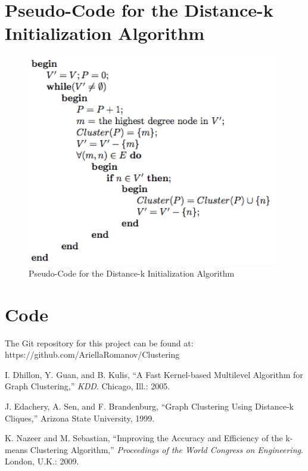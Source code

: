 \documentclass[12pt]{article}
\begin{document}
\newpage
\section{Pseudo-Code for the Distance-k Initialization Algorithm}
\label{appendix:distk_init}
\begin{figure}[!htb]
\begin{center}
	\includegraphics[height=25em]{distk_init}
	\caption{Pseudo-Code for the Distance-k Initialization Algorithm}
\end{center}
\end{figure}

\newpage
\section{Code}
\label{appendix:code}
The Git repository for this project can be found at:
\newline\newline
https://github.com/AriellaRomanov/Clustering

\newpage
\begin{thebibliography}{9}

I. Dhillon, Y. Guan, and B. Kulis, ``A Fast Kernel-based Multilevel Algorithm for Graph Clustering,'' \textit{KDD}. Chicago, Ill.: 2005.
 
J. Edachery, A. Sen, and F. Brandenburg, ``Graph Clustering Using Distance-k Cliques,'' Arizona State University, 1999.
 
K. Nazeer and M. Sebastian, ``Improving the Accuracy and Efficiency of the k-means Clustering Algorithm,'' 
\textit{Proceedings of the World Congress on Engineering}. London, U.K.: 2009.

\end{thebibliography}

\end{document}
